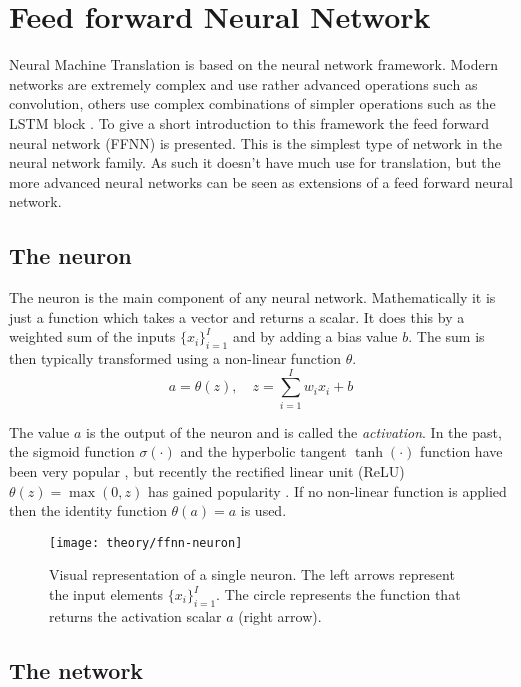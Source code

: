 \section{Feed forward Neural Network}
\label{sec:theory:ffnn}

Neural Machine Translation is based on the neural network framework. Modern networks are extremely complex and use rather advanced operations such as convolution, others use complex combinations of simpler operations such as the LSTM block \cite{deep-learning}. To give a short introduction to this framework the feed forward neural network (FFNN) is presented. This is the simplest type of network in the neural network family. As such it doesn't have much use for translation, but the more advanced neural networks can be seen as extensions of a feed forward neural network.

\subsection{The neuron}

The neuron is the main component of any neural network. Mathematically it is just a function which takes a vector and returns a scalar. It does this by a weighted sum of the inputs $\{ x_i \}_{i=1}^I$ and by adding a bias value $b$. The sum is then typically transformed using a non-linear function $\theta$.
\begin{equation}
a = \theta(z),\quad z = \sum_{i=1}^I w_{i} x_i + b
\end{equation}

The value $a$ is the output of the neuron and is called the \textit{activation}. In the past, the sigmoid function $\sigma(\cdot)$ and the hyperbolic tangent $\tanh(\cdot)$ function have been very popular \cite{bishop}, but recently the rectified linear unit (ReLU) $\theta(z) = \max(0, z)$ has gained popularity \cite{deep-learning}. If no non-linear function is applied then the identity function $\theta(a) = a$ is used.

\begin{figure}[H]
	\centering
	\texttt{[image: theory/ffnn-neuron]}
	\caption{Visual representation of a single neuron. The left arrows represent the input elements $\{ x_i \}_{i=1}^I$. The circle represents the function that returns the activation scalar $a$ (right arrow).}
\end{figure}

\subsection{The network}

